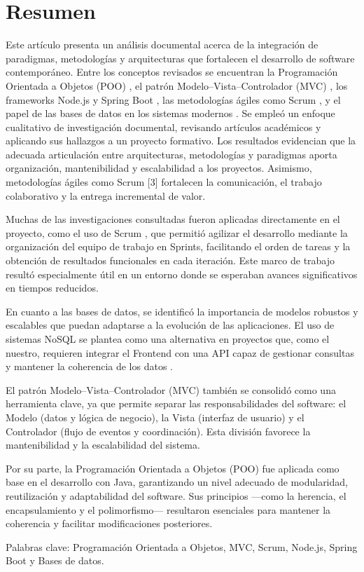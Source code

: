 \section{Resumen}
Este artículo presenta un análisis documental acerca de la integración de paradigmas, metodologías y arquitecturas que fortalecen el desarrollo de software contemporáneo. Entre los conceptos revisados se encuentran la Programación Orientada a Objetos (POO) \cite{poo}, el patrón Modelo–Vista–Controlador (MVC) \cite{mvc}, los frameworks Node.js y Spring Boot \cite{nodejs_springboot}, las metodologías ágiles como Scrum \cite{scrum}, y el papel de las bases de datos en los sistemas modernos \cite{databases}. Se empleó un enfoque cualitativo de investigación documental, revisando artículos académicos y aplicando sus hallazgos a un proyecto formativo. Los resultados evidencian que la adecuada articulación entre arquitecturas, metodologías y paradigmas aporta organización, mantenibilidad y escalabilidad a los proyectos. Asimismo, metodologías ágiles como Scrum [3] fortalecen la comunicación, el trabajo colaborativo y la entrega incremental de valor.

Muchas de las investigaciones consultadas fueron aplicadas directamente en el proyecto, como el uso de Scrum \cite{scrum}, que permitió agilizar el desarrollo mediante la organización del equipo de trabajo en Sprints, facilitando el orden de tareas y la obtención de resultados funcionales en cada iteración. Este marco de trabajo resultó especialmente útil en un entorno donde se esperaban avances significativos en tiempos reducidos.

En cuanto a las bases de datos, se identificó la importancia de modelos robustos y escalables que puedan adaptarse a la evolución de las aplicaciones. El uso de sistemas NoSQL se plantea como una alternativa en proyectos que, como el nuestro, requieren integrar el Frontend con una API capaz de gestionar consultas y mantener la coherencia de los datos \cite{databases}.

El patrón Modelo–Vista–Controlador (MVC) \cite{mvc} también se consolidó como una herramienta clave, ya que permite separar las responsabilidades del software: el Modelo (datos y lógica de negocio), la Vista (interfaz de usuario) y el Controlador (flujo de eventos y coordinación). Esta división favorece la mantenibilidad y la escalabilidad del sistema.

Por su parte, la Programación Orientada a Objetos (POO) \cite{poo} fue aplicada como base en el desarrollo con Java, garantizando un nivel adecuado de modularidad, reutilización y adaptabilidad del software. Sus principios —como la herencia, el encapsulamiento y el polimorfismo— resultaron esenciales para mantener la coherencia y facilitar modificaciones posteriores.

Palabras clave: Programación Orientada a Objetos, MVC, Scrum, Node.js, Spring Boot y Bases de datos.
